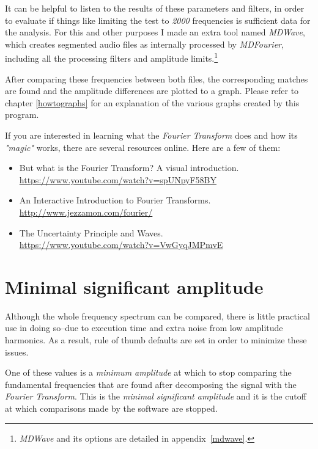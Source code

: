 \documentclass[10pt,a4paper]{report}
\begin{document}
It can be helpful to listen to the results of these parameters and filters, in order to evaluate if things like limiting the test to \textit{2000} frequencies is sufficient data for the analysis. For this and other purposes I made an extra tool named \textit{MDWave}, which creates segmented audio files as internally processed by \textit{MDFourier}, including all the processing filters and amplitude limits.\footnote{\textit{MDWave} and its options are detailed in appendix~\ref{mdwave}.}

After comparing these frequencies between both files, the corresponding matches are found and the amplitude differences are plotted to a graph. Please refer to chapter \ref{howtographs} for an explanation of the various graphs created by this program.

If you are interested in learning what the \textit{Fourier Transform} does and how its \textit{"magic"} works, there are several resources online. Here are a few of them:

\begin{itemize}
	\item But what is the Fourier Transform? A visual introduction.\\ \url{https://www.youtube.com/watch?v=spUNpyF58BY}
	\item An Interactive Introduction to Fourier Transforms.\\ \url{http://www.jezzamon.com/fourier/}
	\item The Uncertainty Principle and Waves.\\ \url{https://www.youtube.com/watch?v=VwGyqJMPmvE}
\end{itemize}

\section{Minimal significant amplitude}
\label{MinSigAmplitude}

Although the whole frequency spectrum can be compared, there is little practical use in doing so--due to execution time and extra noise from low amplitude harmonics. As a result, rule of thumb defaults are set in order to minimize these issues.

One of these values is a \textit{minimum amplitude} at which to stop comparing the fundamental frequencies that are found after decomposing the signal with the \textit{Fourier Transform}. This is the \textit{minimal significant amplitude} and it is the cutoff at which comparisons made by the software are stopped.
\end{document}
